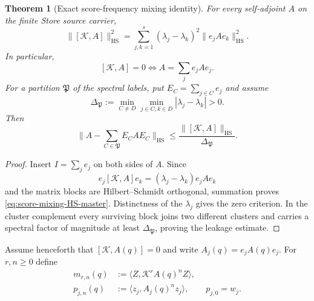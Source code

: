 \documentclass[11pt]{article}
\newtheorem{theorem}{Theorem}[section]
\theoremstyle{definition}
\theoremstyle{remark}
\newcommand{\norm}[1]{\lVert#1\rVert}
\newcommand{\HS}{\mathrm{HS}}
\begin{document}
\begin{theorem}[Exact score-frequency mixing identity]
\label{thm:score-frequency-mixing-master}
For every self-adjoint $A$ on the finite Store source carrier,
\begin{equation}
  \boxed{
  \norm{[\mathscr K,A]}_{\HS}^2
  =\sum_{j,k=1}^{s}(\lambda_j-\lambda_k)^2
    \norm{e_jAe_k}_{\HS}^2.}
  \label{eq:score-mixing-HS-master}
\end{equation}
In particular,
\begin{equation}
  \boxed{[\mathscr K,A]=0
  \iff A=\sum_je_jAe_j.}
  \label{eq:score-mixing-zero-master}
\end{equation}
For a partition $\mathfrak P$ of the spectral labels, put
$E_C=\sum_{j\in C}e_j$ and assume
\[
  \Delta_{\mathfrak P}
  :=\min_{C\ne D}\min_{j\in C,k\in D}
  |\lambda_j-\lambda_k|>0.
\]
Then
\begin{equation}
  \boxed{
  \norm{A-\sum_{C\in\mathfrak P}E_CAE_C}_{\HS}
  \le
  \frac{\norm{[\mathscr K,A]}_{\HS}}{\Delta_{\mathfrak P}}.}
  \label{eq:score-cluster-leakage-master}
\end{equation}
\end{theorem}

\begin{proof}
Insert $I=\sum_je_j$ on both sides of $A$.  Since
\[
  e_j[\mathscr K,A]e_k
  =(\lambda_j-\lambda_k)e_jAe_k
\]
and the matrix blocks are Hilbert--Schmidt orthogonal, summation proves
\eqref{eq:score-mixing-HS-master}.  Distinctness of the $\lambda_j$ gives the
zero criterion.  In the cluster complement every surviving block joins two
different clusters and carries a spectral factor of magnitude at least
$\Delta_{\mathfrak P}$, proving the leakage estimate.
\end{proof}

Assume henceforth that $[\mathscr K,A(q)]=0$ and write
$A_j(q)=e_jA(q)e_j$.  For $r,n\ge0$ define
\begin{align}
  m_{r,n}(q)&:=\langle Z,\mathscr K^rA(q)^nZ\rangle,
  \label{eq:mixed-score-moment-master}\\
  p_{j,n}(q)&:=\langle z_j,A_j(q)^nz_j\rangle,
  \qquad p_{j,0}=w_j.
  \label{eq:block-score-moment-master}
\end{align}
\end{document}
